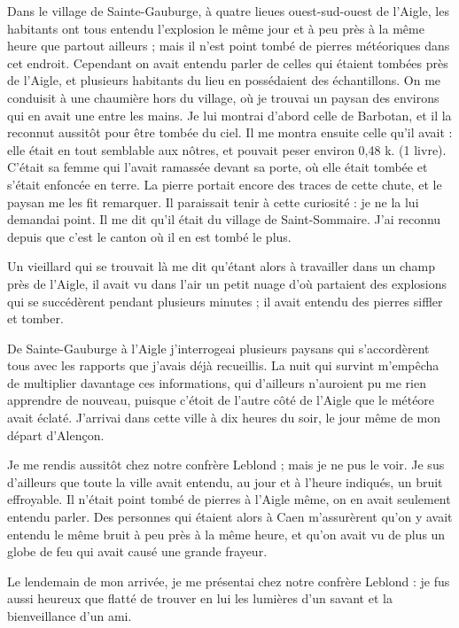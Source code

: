 \documentclass[a4paper, 11pt, oneside, polutonikogreek, french]{article}
\begin{document}
Dans le village de Sainte-Gauburge, à quatre lieues ouest-sud-ouest de l'Aigle, les habitants ont tous entendu l'explosion le même jour et à peu près à la même heure que partout ailleurs ; mais il n'est point tombé de pierres météoriques dans cet endroit. Cependant on avait entendu parler de celles qui étaient tombées près de l'Aigle, et plusieurs habitants du lieu en possédaient des échantillons. On me conduisit à une chaumière hors du village, où je trouvai un paysan des environs qui en avait une entre les mains. Je lui montrai d'abord celle de Barbotan, et il la reconnut aussitôt pour être tombée du ciel. Il me montra ensuite celle qu'il avait : elle était en tout semblable aux nôtres, et pouvait peser environ 0,48 k. (1 livre). C'était sa femme qui l'avait ramassée devant sa porte, où elle était tombée et s'était enfoncée en terre. La pierre portait encore des traces de cette chute, et le paysan me les fit remarquer. Il paraissait tenir à cette curiosité : je ne la lui demandai point. Il me dit qu'il était du village de Saint-Sommaire. J'ai reconnu depuis que c'est le canton où il en est tombé le plus.

Un vieillard qui se trouvait là me dit qu'étant alors à travailler dans un champ près de l'Aigle, il avait vu dans l'air un petit nuage d'où partaient des explosions qui se succédèrent pendant plusieurs minutes ; il avait entendu des pierres siffler et tomber.

De Sainte-Gauburge à l'Aigle j'interrogeai plusieurs paysans qui s'accordèrent tous avec les rapports que j'avais déjà recueillis. La nuit qui survint m'empêcha de multiplier davantage ces informations, qui d'ailleurs n'auroient pu me rien apprendre de nouveau, puisque c'étoit de l'autre côté de l'Aigle que le météore avait éclaté. J'arrivai dans cette ville à dix heures du soir, le jour même de mon départ d'Alençon.

Je me rendis aussitôt chez notre confrère Leblond ; mais je ne pus le voir. Je sus d'ailleurs que toute la ville avait entendu, au jour et à l'heure indiqués, un bruit effroyable. Il n'était point tombé de pierres à l'Aigle même, on en avait seulement entendu parler. Des personnes qui étaient alors à Caen m'assurèrent qu'on y avait entendu le même bruit à peu près à la même heure, et qu'on avait vu de plus un globe de feu qui avait causé une grande frayeur.

Le lendemain de mon arrivée, je me présentai chez notre confrère Leblond : je fus aussi heureux que flatté de trouver en lui les lumières d'un savant et la bienveillance d'un ami.
\end{document}
